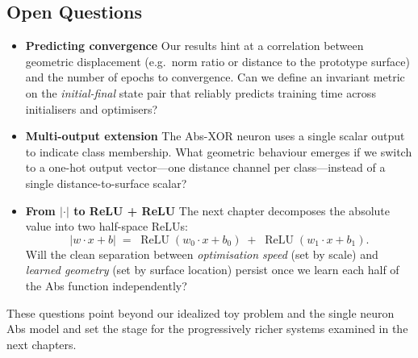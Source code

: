 \subsection*{Open Questions}

\begin{itemize}
    \item \textbf{Predicting convergence}  
          Our results hint at a correlation between geometric displacement
          (e.g.\ norm ratio or distance to the prototype surface) and the
          number of epochs to convergence.  Can we define an invariant metric
          on the \emph{initial-final} state pair that reliably predicts
          training time across initialisers and optimisers?

    \item \textbf{Multi-output extension}  
          The Abs-XOR neuron uses a single scalar output to indicate class
          membership.  What geometric behaviour emerges if we switch to a
          one-hot output vector—one distance channel per class—instead of a
          single distance-to-surface scalar?

    \item \textbf{From $\lvert\cdot\rvert$ to ReLU + ReLU}  
          The next chapter decomposes the absolute value into two half-space
          ReLUs:  
          \[
              \lvert w\!\cdot\!x + b\rvert
              \;=\;
              \operatorname{ReLU}(w_0\!\cdot\!x + b_0)
              \;+\;
              \operatorname{ReLU}(w_1\!\cdot\!x + b_1).
          \]
          Will the clean separation between \emph{optimisation speed} (set by
          scale) and \emph{learned geometry} (set by surface location) persist
          once we learn each half of the Abs function independently?
\end{itemize}

These questions point beyond our idealized toy problem and the single 
neuron Abs model and set the stage for the progressively richer systems 
examined in the next chapters.
